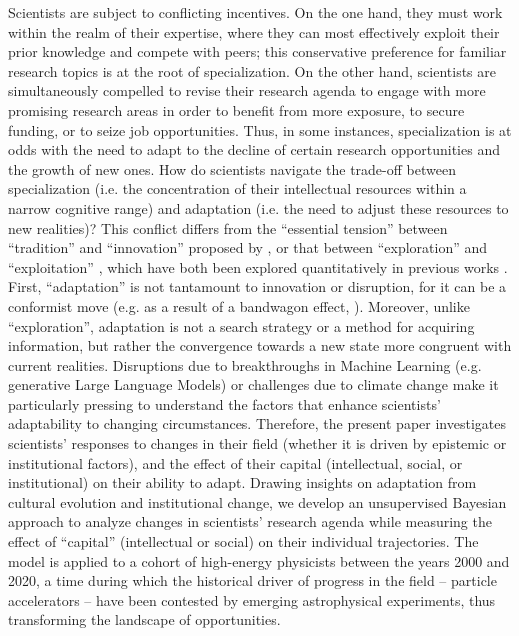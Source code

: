 \documentclass{article}
\begin{document}
Scientists are subject to conflicting incentives. On the one hand, they must work within the realm of their expertise, where they can most effectively exploit their prior knowledge and compete with peers; this conservative preference for familiar research topics is at the root of specialization. On the other hand, scientists are simultaneously compelled to revise their research agenda to engage with more promising research areas in order to benefit from more exposure, to secure funding, or to seize job opportunities. Thus, in some instances, specialization is at odds with the need to adapt to the decline of certain research opportunities and the growth of new ones. How do scientists navigate the trade-off between specialization (i.e. the concentration of their intellectual resources within a narrow cognitive range) and adaptation (i.e. the need to adjust these resources to new realities)? This conflict differs from the ``essential tension'' between ``tradition'' and ``innovation'' proposed by \citet{Kuhn1997}, or that between ``exploration'' and ``exploitation'' \citep{March1991}, which have both been explored quantitatively in previous works \citep{Foster2015,Jia2017,Aleta2019,Zeng2019,Tripodi2020,Chakresh2023,Feifan2023}%
. First, ``adaptation'' is not tantamount to innovation or disruption, for it can be a conformist move (e.g. as a result of a bandwagon effect, \citealt{Fujimura1988}). Moreover,  unlike ``exploration'', adaptation is not a search strategy or a method for acquiring information, but rather the convergence towards a new state more congruent with current realities. Disruptions due to breakthroughs in Machine Learning (e.g. generative Large Language Models) or challenges due to climate change make it particularly pressing to understand the factors that enhance scientists' adaptability to changing circumstances. Therefore, the present paper investigates scientists' responses to changes in their field (whether it is driven by epistemic or institutional factors), and the effect of their capital (intellectual, social, or institutional) on their ability to adapt. Drawing insights on adaptation from cultural evolution and institutional change, we develop an unsupervised Bayesian approach to analyze changes in scientists' research agenda while measuring the effect of ``capital'' (intellectual or social) on their individual trajectories. The model is applied to a cohort of high-energy physicists between the years 2000 and 2020, a time during which the historical driver of progress in the field -- particle accelerators -- have been contested by emerging astrophysical experiments, thus transforming the landscape of opportunities. %
\end{document}
